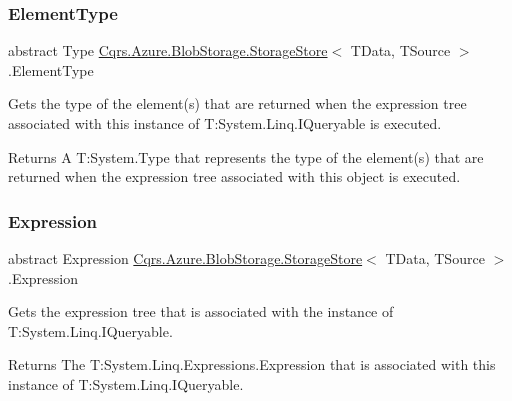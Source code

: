 \subsubsection{\texorpdfstring{Element\+Type}{ElementType}}
{\footnotesize\ttfamily abstract Type \hyperlink{classCqrs_1_1Azure_1_1BlobStorage_1_1StorageStore}{Cqrs.\+Azure.\+Blob\+Storage.\+Storage\+Store}$<$ T\+Data, T\+Source $>$.Element\+Type\hspace{0.3cm}{\ttfamily [get]}}



Gets the type of the element(s) that are returned when the expression tree associated with this instance of T\+:\+System.\+Linq.\+I\+Queryable is executed. 

\begin{DoxyReturn}{Returns}
A T\+:\+System.\+Type that represents the type of the element(s) that are returned when the expression tree associated with this object is executed. 
\end{DoxyReturn}
\mbox{\label{classCqrs_1_1Azure_1_1BlobStorage_1_1StorageStore_a21c204b514718b8af550ce2a627c4b70_a21c204b514718b8af550ce2a627c4b70}} 
\subsubsection{\texorpdfstring{Expression}{Expression}}
{\footnotesize\ttfamily abstract Expression \hyperlink{classCqrs_1_1Azure_1_1BlobStorage_1_1StorageStore}{Cqrs.\+Azure.\+Blob\+Storage.\+Storage\+Store}$<$ T\+Data, T\+Source $>$.Expression\hspace{0.3cm}{\ttfamily [get]}}



Gets the expression tree that is associated with the instance of T\+:\+System.\+Linq.\+I\+Queryable. 

\begin{DoxyReturn}{Returns}
The T\+:\+System.\+Linq.\+Expressions.\+Expression that is associated with this instance of T\+:\+System.\+Linq.\+I\+Queryable. 
\end{DoxyReturn}
\mbox{\label{classCqrs_1_1Azure_1_1BlobStorage_1_1StorageStore_acc1c1e865c9a59772a29cfe44d39e48a_acc1c1e865c9a59772a29cfe44d39e48a}} 
